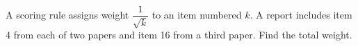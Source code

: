 A scoring rule assigns weight $\dfrac{1}{\sqrt k}$ to an item numbered $k$. A report includes item 4 from each of two papers and item 16 from a third paper. Find the total weight.
